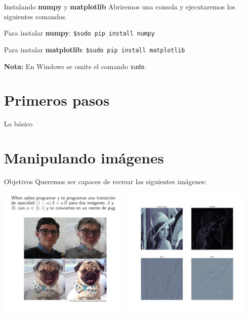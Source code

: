 \documentclass{beamer}
\begin{document}
  \begin{frame}{Instalando \textbf{numpy} y \textbf{matplotlib}}
    Abriremos una consola y ejecutaremos los siguientes comandos.
    \begin{block}{Para instalar \textbf{numpy}:}
      \texttt{\$\hspace{0.3cm}sudo pip install numpy}
    \end{block}
    \vspace*{0.5cm}
    \begin{block}{Para instalar \textbf{matplotlib}:}
      \texttt{\$\hspace{0.3cm}sudo pip install matplotlib}
    \end{block}
    \textbf{Nota:} En Windows se omite el comando \texttt{sudo}.
  \end{frame}

  \section{Primeros pasos}
  \begin{frame}{Lo básico}

  \end{frame}

  \section{Manipulando imágenes}
  \begin{frame}{Objetivos}
    Queremos ser capaces de recrear las siguientes imágenes:
    \begin{center}
      \includegraphics[width=0.48\textwidth]{imgs/meme}\hspace{0.1cm}
      \includegraphics[width=0.48\textwidth]{imgs/derivatives}
    \end{center}
  \end{frame}
\end{document}
